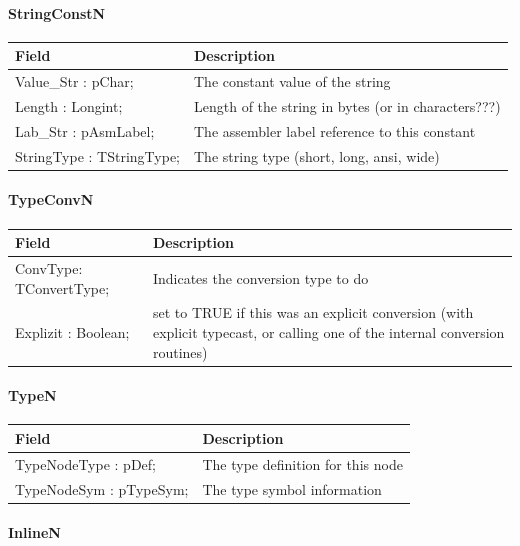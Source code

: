 \documentclass [a4paper,12pt]{article}
\begin{document}
\paragraph{StringConstN}\mbox{}

\begin{longtable}{|l|p{10cm}|}
\hline
Field   & Description \\
\hline
\endhead
\hline
\endfoot
\textsf{Value{\_}Str : pChar;}    & The constant value of the string \\
\textsf{Length : Longint;}    & Length of the string in bytes (or in characters???) \\
\textsf{Lab{\_}Str : pAsmLabel;}  & The assembler label reference to this constant \\
\textsf{StringType : TStringType;}& The string type (short, long, ansi, wide)
\end{longtable}

\paragraph{TypeConvN}\mbox{}

\begin{longtable}{|l|p{10cm}|}
\hline
Field   & Description \\
\hline
\endhead
\hline
\endfoot
\textsf{ConvType: TConvertType;}& Indicates the conversion type to do \\
\textsf{Explizit : Boolean;}&
    set to TRUE if this was an explicit conversion (with explicit
    typecast, or calling one of the internal conversion routines)
\end{longtable}

\paragraph{TypeN}\mbox{}

\begin{longtable}{|l|p{10cm}|}
\hline
Field   & Description \\
\hline
\endhead
\hline
\endfoot
\textsf{TypeNodeType : pDef;}& The type definition for this node  \\
\textsf{TypeNodeSym : pTypeSym;}& The type symbol information
\label{tab24}
\end{longtable}

\paragraph{InlineN}\mbox{}
\end{document}
